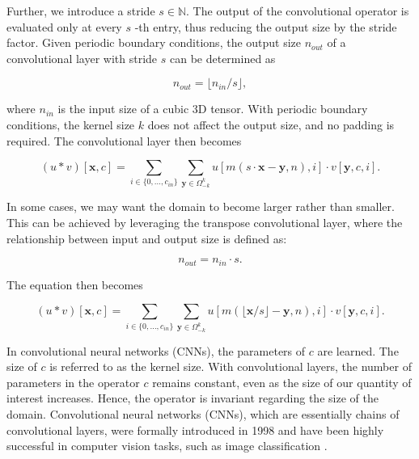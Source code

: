 \documentclass{article}
\begin{document}
Further, we introduce a stride $s \in \mathbb{N}$. The output of the convolutional operator is evaluated only at every $s$ -th entry, thus reducing the output size by the stride factor. Given periodic boundary conditions, the output size $n_{out}$ of a convolutional layer with stride $s$ can be determined as

\begin{equation}
    n_{out} = \lfloor n_{in} / s \rfloor,
\end{equation}

where $n_{in}$ is the input size of a cubic 3D tensor. With periodic boundary conditions, the kernel size $k$ does not affect the output size, and no padding is required. The convolutional layer then becomes

\begin{equation}
    (u \ast v)[\mathbf{x}, c] = \sum_{i \in \{0, \dots, c_{in}\}} \sum_{\mathbf{y} \in \Omega_{-k}^{k}} u\left[m(s \cdot \mathbf{x} - \mathbf{y}, n), i\right] \cdot v[\mathbf{y}, c, i].
\end{equation}

In some cases, we may want the domain to become larger rather than smaller. This can be achieved by leveraging the transpose convolutional layer, where the relationship between input and output size is defined as:

\begin{equation}
    n_{out} = n_{in} \cdot s.
\end{equation}

The equation then becomes

\begin{equation}
    (u \ast v)[\mathbf{x}, c] = \sum_{i \in \{0, \dots, c_{in}\}} \sum_{\mathbf{y} \in \Omega_{-k}^{k}} u\left[m(\lfloor \mathbf{x} / s \rfloor - \mathbf{y}, n), i\right] \cdot v[\mathbf{y}, c, i].
\end{equation}

In convolutional neural networks (CNNs), the parameters of \(c\) are learned. The size of \(c\) is referred to as the kernel size. With convolutional layers, the number of parameters in the operator \(c\) remains constant, even as the size of our quantity of interest increases. Hence, the operator is invariant regarding the size of the domain. Convolutional neural networks (CNNs), which are essentially chains of convolutional layers, were formally introduced in 1998 \citep{lecun1998gradient} and have been highly successful in computer vision tasks, such as image classification \citep{krizhevsky2012imagenet}.
\end{document}
